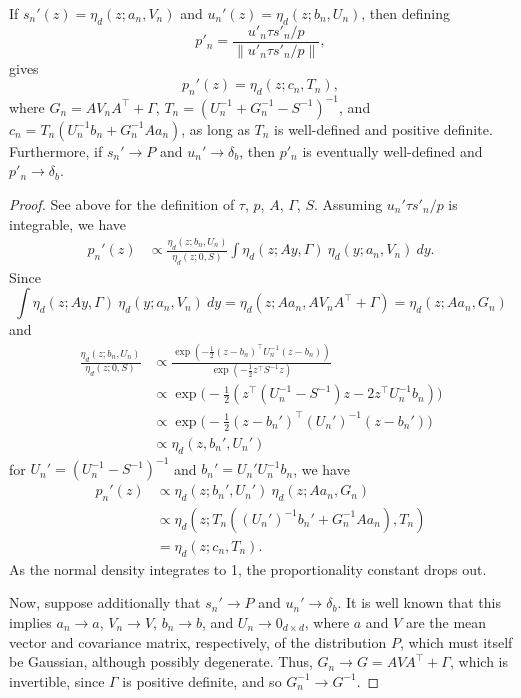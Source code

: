 \begin{lemma} \label{lem:our_estimate}
If $s_n'(z)  = \eta_d(z; a_n,V_n)$ and $u_n'(z) = \eta_d(z; b_n,U_n)$, then defining 
\[ p'_n = \frac{u'_n\tau s'_n/p}{\|u'_n\tau s'_n/p\|} , \]
gives
\[
p_n'(z) = \eta_d(z; c_n, T_n) ,
\]
 where
$G_n = A V_n A^\intercal + \Gamma$,
$T_n = (U_n^{-1} + G_n^{-1} - S^{-1})^{-1}$, and 
$c_n = T_n(U_n^{-1}b_n + G_n^{-1}Aa_n)$, as long as $T_n$ is well-defined and positive definite. Furthermore, if $s_n'\to P$ and $u_n'\to\delta_b$, then $p'_n$ is eventually well-defined and $p'_n\to \delta_b$.
\end{lemma}

\begin{proof}
See above for the definition of $\tau$, $p$, $A$, $\Gamma$, $S$. Assuming $u_n'\tau s'_n/p$ is integrable, we have
\begin{align*}
p_n'(z) 
& \propto \frac{\eta_d(z; b_n, U_n)}{\eta_d(z;0,S)} \int \eta_d(z; Ay, \Gamma) \ \eta_d(y; a_n,V_n)\ dy .
\end{align*}
Since
\[
\int \eta_d(z; Ay, \Gamma) \ \eta_d(y; a_n,V_n)\ dy 
= \eta_d(z; Aa_n, AV_nA^\intercal + \Gamma)
= \eta_d(z; Aa_n, G_n)
\]
and
\begin{align*}
\frac{\eta_d(z; b_n, U_n)}{\eta_d(z;0,S)}
& \propto \frac{\exp(-\tfrac{1}{2}(z - b_n)^\intercal U_n^{-1} (z-b_n))}{\exp(-\tfrac{1}{2} z^\intercal S^{-1} z)} \\
& \propto  \exp\big( -\tfrac{1}{2}(z^\intercal (U_n^{-1}-S^{-1}) z - 2z^\intercal U_n^{-1} b_n)\big)\\
& \propto  \exp\big( -\tfrac{1}{2}(z-b_n')^\intercal (U_n')^{-1} (z-b_n') \big) \\
&\propto \eta_d(z, b_n', U_n')
\end{align*}
for $U_n' = (U_n^{-1}-S^{-1})^{-1}$ and $b_n' = U_n' U_n^{-1} b_n$, we have
\begin{align*}
p_n'(z) 
& \propto \eta_d(z; b_n', U_n')\ \eta_d(z; Aa_n, G_n) \\
& \propto \eta_d(z; T_n((U_n')^{-1}b_n'+ G_n^{-1} Aa_n), T_n) \\
& = \eta_d(z; c_n, T_n) .
\end{align*}
As the normal density integrates to 1, the proportionality constant drops out.

Now, suppose additionally that $s_n'\to P$ and $u_n'\to\delta_b$. It is well known that this implies $a_n\to a$, $V_n\to V$, $b_n\to b$, and $U_n\to 0_{d\times d}$, where $a$ and $V$ are the mean vector and covariance matrix, respectively, of the distribution $P$, which must itself be Gaussian, although possibly degenerate. Thus, $G_n\to G=AVA^\intercal + \Gamma$, which is invertible, since $\Gamma$ is positive definite, and so $G_n^{-1}\to G^{-1}$.


\end{proof}
